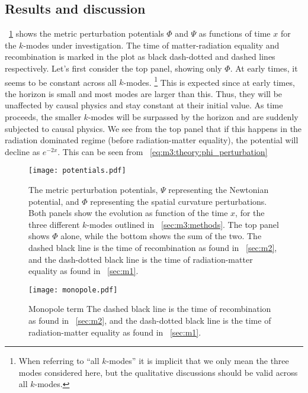 \subsection{Results and discussion}\label{sec:m3:results}
    
    ~\cref{fig:m3:potentials} shows the metric perturbation potentials $\Phi$ and $\Psi$ as functions of time $x$ for the $k$-modes under investigation. The time of matter-radiation equality and recombination is marked in the plot as black dash-dotted and dashed lines respectively. Let's first consider the top panel, showing only $\Phi$. At early times, it seems to be constant across all $k$-modes. \footnote{When referring to ``all $k$-modes'' it is implicit that we only mean the three modes considered here, but the qualitative discussions should be valid across all $k$-modes.} This is expected since at early times, the horizon is small and most modes are larger than this. Thus, they will be unaffected by causal physics and stay constant at their initial value. As time proceeds, the smaller $k$-modes will be surpassed by the horizon and are suddenly subjected to causal physics. We see from the top panel that if this happens in the radiation dominated regime (before radiation-matter equality), the potential will decline as $e^{-2x}$. This can be seen from ~\cref{eq:m3:theory:phi_perturbation} 
    \begin{figure}
        \texttt{[image: potentials.pdf]}
        \caption{The metric perturbation potentials, $\Psi$ representing the Newtonian potential, and $\Phi$ representing the spatial curvature perturbations. Both panels show the evolution as function of the time $x$, for the three different $k$-modes outlined in ~\cref{sec:m3:methods}. The top panel shows $\Phi$ alone, while the bottom shows the sum of the two. The dashed black line is the time of recombination as found in ~\cref{sec:m2}, and the dash-dotted black line is the time of radiation-matter equality as found in ~\cref{sec:m1}.}
        \label{fig:m3:potentials}
    \end{figure}

    \begin{figure}
        \texttt{[image: monopole.pdf]}
        \caption{Monopole term The dashed black line is the time of recombination as found in ~\cref{sec:m2}, and the dash-dotted black line is the time of radiation-matter equality as found in ~\cref{sec:m1}.}
        \label{fig:m3:monopole}
    \end{figure}

